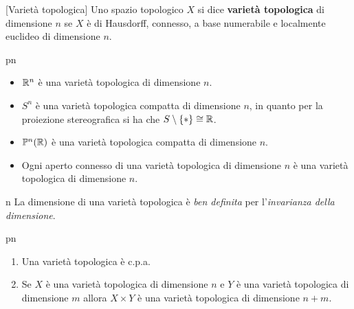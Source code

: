 \begin{definition}{}[Varietà topologica]
	Uno spazio topologico $X$ si dice \textbf{varietà topologica} di dimensione $n$ se $X$ è di Hausdorff, connesso, a base numerabile e localmente euclideo di dimensione $n$.
\end{definition}

\begin{example}{pn}~{}
	\begin{itemize}
		\item $\mathbb{R}^n$ è una varietà topologica di dimensione $n$.
		\item $S^n$ è una varietà topologica compatta di dimensione $n$, in quanto per la proiezione stereografica si ha che $S\setminus\{*\}\cong \mathbb{R}$.
		\item $\mathbb{P}^n(\mathbb{R})$ è una varietà topologica compatta di dimensione $n$.
		\item Ogni aperto connesso di una varietà topologica di dimensione $n$ è una varietà topologica di dimensione $n$.
	\end{itemize}
\end{example}
\begin{remark}{n}
	La dimensione di una varietà topologica è \textit{ben definita} per l'\textit{invarianza della dimensione}.
\end{remark}
\begin{remark}{pn}~{}
	\begin{enumerate}
		\item Una varietà topologica è c.p.a.
		\item Se $X$ è una varietà topologica di dimensione $n$ e $Y$ è una varietà topologica di dimensione $m$ allora $X\times Y$ è una varietà topologica di dimensione $n+m$.
	\end{enumerate}
\end{remark}

